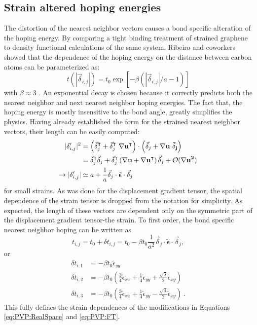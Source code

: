 \subsection{Strain altered hoping energies}
The distortion of the nearest neighbor vectors causes a bond specific alteration of the hoping energy.
By comparing a tight binding treatment of strained graphene to density functional calculations of the same system, Ribeiro and coworkers showed that the dependence of the hoping energy on the distance between carbon atoms can be parameterized as:
\begin{equation*}
  t(|\vec{\delta}_{i,j}|)=t_0 \exp[-\beta (|\vec{\delta}_{i,j}|/a-1)]
\end{equation*}
with $\beta\approx 3$ \cite{Pereira2009,Ribeiro2009,CastroNeto2009}.
An exponential decay is chosen because it correctly predicts both the nearest neighbor and next nearest neighbor hoping energies.
The fact that, the hoping energy is mostly insensitive to the bond angle, greatly simplifies the physics.
Having already established the form for the strained nearest neighbor vectors, their length can be easily computed:
\begin{align*}
  |\delta'_{i,j}|^2&=\left(\vec{\delta}_{j}^{\intercal}+\vec{\delta}_{j}^{\intercal} \ \bf{\nabla u}^{\intercal} \right) \cdot
    \left(\vec{\delta}_{j}+\bf{\nabla u} \ \vec{\delta}_{j} \right) \\
    &=\vec{\delta}_{j}^{\intercal} \vec{\delta}_{j}+
      \vec{\delta}_{j}^{\intercal} \left(\bf{\nabla u}+\bf{\nabla u}^{\intercal} \right) \vec{\delta}_{j}+
      \mathcal{O}(\bf{\nabla u}^2) \\
  \rightarrow |\delta'_{i,j}|&\simeq a+\frac{1}{a} \vec{\delta}_{j} \cdot \tilde{\bm{\epsilon}} \cdot \vec{\delta}_{j}
\end{align*}
for small strains.
As was done for the displacement gradient tensor, the spatial dependence of the strain tensor is dropped from the notation for simplicity.
As expected, the length of these vectors are dependent only on the symmetric part of the displacement gradient tensor-the strain.
To first order, the bond specific nearest neighbor hoping can be written as
\begin{equation*}
  t_{i,j}=t_0+\delta t_{i,j}=t_0-\beta t_0 \frac{1}{a^2} \vec{\delta}_{j} \cdot \tilde{\bm{\epsilon}} \cdot \vec{\delta}_{j},
\end{equation*}
or
\begin{align}
  \delta t_{i,1}&=-\beta t_0 \tilde{\epsilon}_{yy} \nonumber \\
  \delta t_{i,2}&=-\beta t_0 \left( \frac{3}{4}\tilde{\epsilon}_{xx} +\frac{1}{4} \tilde{\epsilon}_{yy} + \frac{\sqrt{3}}{2} \tilde{\epsilon}_{xy} \right) \nonumber \\
  \delta t_{i,3}&=-\beta t_0 \left( \frac{3}{4}\tilde{\epsilon}_{xx} +\frac{1}{4} \tilde{\epsilon}_{yy} - \frac{\sqrt{3}}{2} \tilde{\epsilon}_{xy} \right)  \label{eq:PVP:dtij}\ .
\end{align}
This fully defines the strain dependences of the modifications in Equations \ref{eq:PVP:RealSpace} and \ref{eq:PVP:FT}.

